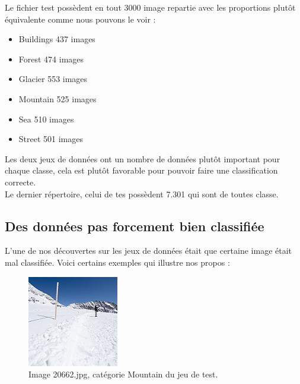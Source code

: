 \documentclass[12pt ,a4paper ]{article}
\begin{document}
\begin{multicols}{2}
Le fichier test possèdent en tout 3000 image repartie avec les proportions plutôt équivalente comme nous pouvons le voir :

\begin{itemize}
\item Buildings 437 images
\item Forest 474 images
\item Glacier 553 images
\item Mountain 525 images
\item Sea 510 images
\item Street 501 images
\end{itemize}
Les deux jeux de données ont un nombre de données plutôt important pour chaque classe, cela est plutôt favorable pour pouvoir faire une classification correcte.\\
Le dernier répertoire, celui de tes possèdent 7.301 qui sont de toutes classe.

\subsection{Des données pas forcement bien classifiée}
L’une de nos découvertes sur les jeux de données était que certaine image était mal classifiée. Voici certains exemples qui illustre nos propos :

\begin{figure}[H]
\begin{center}
\includegraphics[scale=1]{./img/20662.jpg}
\caption{\small{Image 20662.jpg, catégorie Mountain du jeu de test.}}
\end{center}
\end{figure}
 

\end{multicols}
\end{document}
